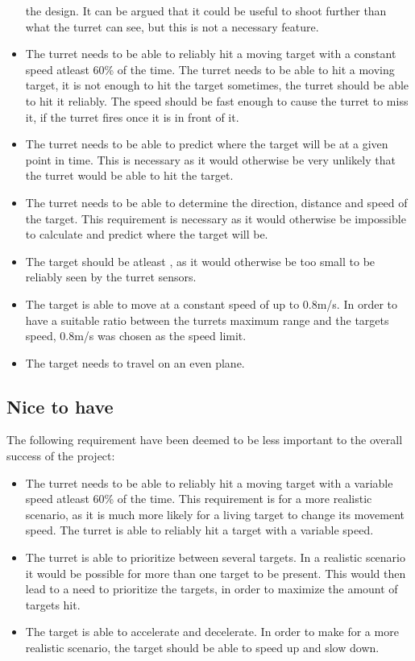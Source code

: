 \begin{itemize}
  the design. It can be argued that it could be useful to shoot further than
  what the turret can see, but this is not a necessary feature.
  \item The turret needs to be able to reliably hit a moving target with a
  constant speed atleast 60\% of the time. The turret needs to be able to hit a
  moving target, it is not enough to hit the target sometimes, the turret should
  be able to hit it reliably. The speed should be fast enough to cause the
  turret to miss it, if the turret fires once it is in front of it.
  \item The turret needs to be able to predict where the target will be at a given point
in time. This is necessary as it would otherwise be very unlikely that the
turret would be able to hit the target.
  \item The turret needs to be able to determine the direction, distance and speed of
the target. This requirement is necessary as it would otherwise be impossible to
calculate and predict where the target will be.
  \item The target should be atleast , as it
would otherwise be too small to be reliably seen by the turret sensors.
  \item The target is able to move at a constant speed of up to 0.8m/s. In order to
have a suitable ratio between the turrets maximum range and the targets
speed, 0.8m/s was chosen as the speed limit.
  \item The target needs to travel on an even plane.
\end{itemize}

\subsection{Nice to have}
The following requirement have been deemed to be less important to the overall
success of the project:
\begin{itemize}
  \item The turret needs to be able to reliably hit a moving target with a
variable speed atleast 60\% of the time. This requirement is for a
more realistic scenario, as it is much more likely for a living target to
change its movement speed. The turret is able to reliably hit a target with a
variable speed.
  \item The turret is able to prioritize between several targets. In a realistic
scenario it would be possible for more than one target to be present. This would
then lead to a need to prioritize the targets, in order to maximize the
amount of targets hit.
  \item The target is able to accelerate and decelerate. In order to make for a
  more realistic scenario, the target should be able to speed up and slow down.
\end{itemize}

